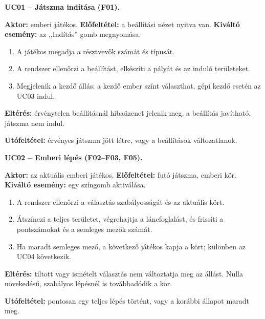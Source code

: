 \documentclass[11pt,a4paper]{article}
\begin{document}
\begin{center}
\end{center}

\textbf{UC01 -- Játszma indítása (F01).}

\textbf{Aktor:} emberi játékos. \textbf{Előfeltétel:} a beállítási nézet nyitva van.
\textbf{Kiváltó esemény:} az ,,Indítás'' gomb megnyomása.
\begin{enumerate}
\item A játékos megadja a résztvevők számát és típusát.
\item A rendszer ellenőrzi a beállítást, elkészíti a pályát és az induló területeket.
\item Megjelenik a kezdő állás; a kezdő ember színt választhat,
  gépi kezdő esetén az UC03 indul.
\end{enumerate}
\textbf{Eltérés:} érvénytelen beállításnál hibaüzenet jelenik meg,
  a beállítás javítható, játszma nem indul.
\par\textbf{Utófeltétel:} érvényes játszma jött létre, vagy a beállítások változatlanok.

\textbf{UC02 -- Emberi lépés (F02--F03, F05).}

\textbf{Aktor:} az aktuális emberi játékos.
\textbf{Előfeltétel:} futó játszma, emberi kör.
\textbf{Kiváltó esemény:} egy színgomb aktiválása.
\begin{enumerate}
\item A rendszer ellenőrzi a választás szabályosságát és az aktuális kört.
\item Átszínezi a teljes területet, végrehajtja a láncfoglalást,
  és frissíti a pontszámokat és a semleges mezők számát.
\item Ha maradt semleges mező, a következő játékos kapja a kört;
  különben az UC04 következik.
\end{enumerate}
\textbf{Eltérés:} tiltott vagy ismételt választás nem változtatja meg az állást.
  Nulla növekedésű, szabályos lépésnél is továbbadódik a kör.
\par\textbf{Utófeltétel:} pontosan egy teljes lépés történt, vagy a korábbi állapot maradt meg.
\end{document}
